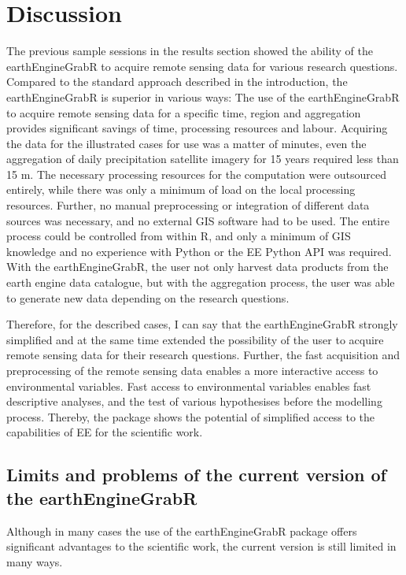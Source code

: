 \chapter{Discussion}


The previous sample sessions in the results section showed the ability of the earthEngineGrabR to acquire remote sensing data for various research questions.
Compared to the standard approach described in the introduction, the earthEngineGrabR is superior in various ways:
The use of the earthEngineGrabR to acquire remote sensing data for a specific time, region and aggregation provides significant savings of time, processing resources and labour. Acquiring the data for the illustrated cases for use was a matter of minutes, even the aggregation of daily precipitation satellite imagery for 15 years required less than 15 m. The necessary processing resources for the computation were outsourced entirely, while there was only a minimum of load on the local processing resources. Further, no manual preprocessing or integration of different data sources was necessary, and no external GIS software had to be used. The entire process could be controlled from within R, and only a minimum of GIS knowledge and no experience with Python or the EE Python API was required. With the earthEngineGrabR, the user not only harvest data products from the earth engine data catalogue, but with the aggregation process, the user was able to  generate new data depending on the research questions. 

Therefore, for the described cases, I can say that the earthEngineGrabR strongly simplified and at the same time extended the possibility of the user to acquire remote sensing data for their research questions. Further, the fast acquisition and preprocessing of the remote sensing data enables a more interactive access to environmental variables.
Fast access to environmental variables enables fast descriptive analyses, and the test of various hypothesises before the modelling process.
Thereby, the package shows the potential of simplified access to the capabilities of EE for the scientific work.


\section{Limits and problems of the current version of the earthEngineGrabR}

Although in many cases the use of the earthEngineGrabR package offers significant advantages to the scientific work, the current version is still limited in many ways. 

